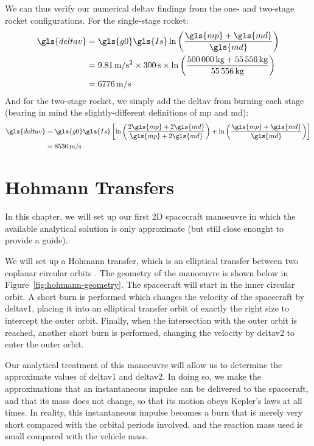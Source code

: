 \documentclass[12pt,openany]{book}
\begin{document}
We can thus verify our numerical \gls{deltav} findings from the one- and two-stage rocket configurations. For the single-stage rocket:
\begin{align}
  \gls{deltav}
  &=
  \gls{g0}\gls{Is}\ln\left(
    \frac{\gls{mp}+\gls{md}}{\gls{md}}
  \right) \\
  &=
  \SI{9.81}{m/s^2}\times\SI{300}{s}\times\ln\left(
    \frac{\SI{500000}{kg} + \SI{55556}{kg}}{\SI{55556}{kg}}
  \right) \\
  &=
  \SI{6776}{m/s}
\end{align}
And for the two-stage rocket, we simply add the \gls{deltav} from burning each stage (bearing in mind the slightly-different definitions of \gls{mp} and \gls{md}):
\begin{align}
  \gls{deltav}
  &=
  \gls{g0}\gls{Is}
  \left[
    \ln\left(
      \frac{2\gls{mp} + 2\gls{md}}{\gls{mp} + 2\gls{md}}
    \right)
    +
    \ln\left(
      \frac{\gls{mp} + \gls{md}}{\gls{md}}
    \right)
  \right] \\
  &= \SI{8536}{m/s}
\end{align}

\chapter{Hohmann Transfers}

In this chapter, we will set up our first 2D spacecraft manoeuvre in which the available analytical solution is only approximate (but still close enought to provide a guide).

We will set up a Hohmann transfer, which is an elliptical transfer between two coplanar circular orbits \cite{battin1999,widnall2008}. The geometry of the manoeuvre is shown below in Figure~\ref{fig:hohmann-geometry}. The spacecraft will start in the inner circular orbit. A short burn is performed which changes the velocity of the spacecraft by \gls{deltav1}, placing it into an elliptical transfer orbit of exactly the right size to intercept the outer orbit. Finally, when the intersection with the outer orbit is reached, another short burn is performed, changing the velocity by \gls{deltav2} to enter the outer orbit.

Our analytical treatment of this manoeuvre will allow us to determine the approximate values of \gls{deltav1} and \gls{deltav2}. In doing so, we make the approximations that an instantaneous impulse can be delivered to the spacecraft, and that its mass does not change, so that its motion obeys Kepler's laws at all times. In reality, this instantaneous impulse becomes a burn that is merely very short compared with the orbital periods involved, and the reaction mass used is small compared with the vehicle mass.
\end{document}
